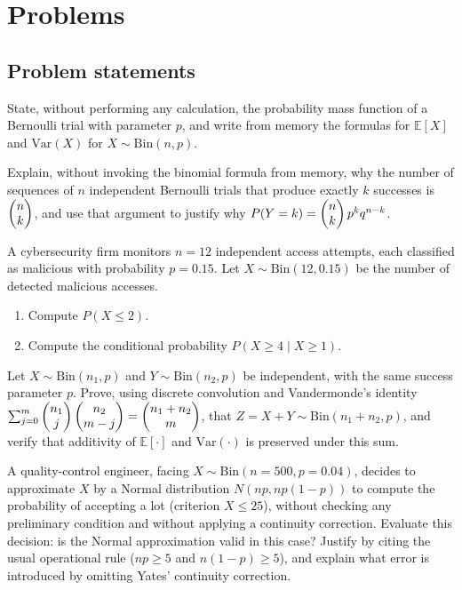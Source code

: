 \section*{Problems}

\subsection*{Problem statements}

\begin{problema}
	\label{prob:71ce5a0}
	State, without performing any calculation, the probability mass function of a Bernoulli trial with parameter $p$, and write from memory the formulas for $\mathbb{E}[X]$ and $\text{Var}(X)$ for $X \sim \text{Bin}(n,p)$.
\end{problema}

\begin{problema}
	\label{prob:1149be6}
	Explain, without invoking the binomial formula from memory, why the number of sequences of $n$ independent Bernoulli trials that produce exactly $k$ successes is $\begin{pmatrix} n \\ k\end{pmatrix}$, and use that argument to justify why $P(Y=k) = \begin{pmatrix} n \\ k\end{pmatrix}p^k q^{n-k}$.
\end{problema}

\begin{problema}
	\label{prob:c3d2032}
	A cybersecurity firm monitors $n=12$ independent access attempts, each classified as malicious with probability $p=0.15$. Let $X \sim \text{Bin}(12, 0.15)$ be the number of detected malicious accesses.
	\begin{enumerate}
		\item Compute $P(X \le 2)$.
		\item Compute the conditional probability $P(X \ge 4 \mid X \ge 1)$.
	\end{enumerate}
\end{problema}

\begin{problema}
	\label{prob:bae56b2}
	Let $X \sim \text{Bin}(n_1,p)$ and $Y \sim \text{Bin}(n_2,p)$ be independent, with the same success parameter $p$. Prove, using discrete convolution and Vandermonde's identity $\sum_{j=0}^m \begin{pmatrix} n_1 \\ j\end{pmatrix}\begin{pmatrix} n_2 \\ m-j\end{pmatrix}=\begin{pmatrix} n_1+n_2 \\ m\end{pmatrix}$, that $Z=X+Y \sim \text{Bin}(n_1+n_2,p)$, and verify that additivity of $\mathbb{E}[\cdot]$ and $\text{Var}(\cdot)$ is preserved under this sum.
\end{problema}

\begin{problema}
	\label{prob:19f50da}
	A quality-control engineer, facing $X \sim \text{Bin}(n=500, p=0.04)$, decides to approximate $X$ by a Normal distribution $N(np, np(1-p))$ to compute the probability of accepting a lot (criterion $X \le 25$), without checking any preliminary condition and without applying a continuity correction. Evaluate this decision: is the Normal approximation valid in this case? Justify by citing the usual operational rule ($np \ge 5$ and $n(1-p) \ge 5$), and explain what error is introduced by omitting Yates' continuity correction.
\end{problema}

